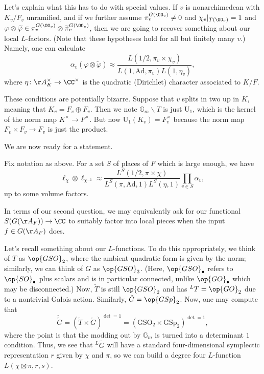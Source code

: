 \documentclass[../notes.tex]{subfiles}
\begin{document}
Let's explain what this has to do with special values. If $v$ is nonarchimedean with $K_v/F_v$ unramified, and if we further assume $\pi_v^{G(\OO_v)}\ne0$ and $\chi_v|_{T(\OO_v)}=1$ and $\varphi\otimes\widetilde\varphi\in\pi_v^{G(\OO_v)}\otimes\widetilde\pi_v^{G(\OO_v)}$, then we are going to recover something about our local $L$-factors. (Note that these hypotheses hold for all but finitely many $v$.) Namely, one can calculate
\[\alpha_v(\varphi\otimes\widetilde\varphi)\approx\frac{L(1/2,\pi_v\times\chi_v)}{L(1,\mathrm{Ad},\pi_v)L(1,\eta_v)},\]
where $\eta\colon\AA_K^\times\to\CC^\times$ is the quadratic (Dirichlet) character associated to $K/F$.
\begin{remark}
	These conditions are potentially bizarre. Suppose that $v$ splits in two up in $K$, meaning that $K_v=F_v\oplus F_v$. Then we note $\mathbb G_m\backslash T$ is just $\mathrm U_1$, which is the kernel of the norm map $K^\times\to F^\times$. But now $\mathrm U_1(K_v)=F_v^\times$ because the norm map $F_v\times F_v\to F_v$ is just the product.
\end{remark}
We are now ready for a statement.
\begin{theorem}
	Fix notation as above. For a set $S$ of places of $F$ which is large enough, we have
	\[\ell_\chi\otimes\ell_{\chi^{-1}}\approx\frac{L^S(1/2,\pi\times\chi)}{L^S(\pi,\mathrm{Ad},1)L^S(\eta,1)}\prod_{v\in S}\alpha_v,\]
	up to some volume factors.
\end{theorem}
\begin{remark}
	In terms of our second question, we may equivalently ask for our functional $S(G(\AA_F))\to\CC$ to suitably factor into local pieces when the input $f\in G(\AA_F)$ does.
\end{remark}
Let's recall something about our $L$-functions. To do this appropriately, we think of $T$ as $\op{GSO}_2$, where the ambient quadratic form is given by the norm; similarly, we can think of $G$ as $\op{GSO}_3$. (Here, $\op{GSO}_\bullet$ refers to $\op{SO}_\bullet$ plus scalars and is in particular connected, unlike $\op{GO}_\bullet$ which may be disconnected.) Now, $\check T$ is still $\op{GSO}_2$ and has $^LT=\op{GO}_2$ due to a nontrivial Galois action. Similarly, $\check G=\op{GSp}_2$. Now, one may compute that
\[\check{\widetilde G}=\left(\check T\times\check G\right)^{\det=1}=\left(\mathrm{GSO}_2\times\mathrm{GSp}_2\right)^{\det=1},\]
where the point is that the modding out by $\mathbb G_m$ is turned into a determinant $1$ condition. Thus, we see that $^L\widetilde G$ will have a standard four-dimensional symplectic representation $r$ given by $\chi$ and $\pi$, so we can build a degree four $L$-function $L(\chi\boxtimes\pi,r,s)$.
\end{document}
